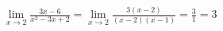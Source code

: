 \begin{ex}
\begin{align}
&\lim_{x\rightarrow 2} \frac{3x-6}{x^2-3x+2}=\lim_{x\rightarrow 2} \frac{3(x-2)}{(x-2)(x-1)}=\frac{3}{1}=3\nonumber
\end{align}
\end{ex}
